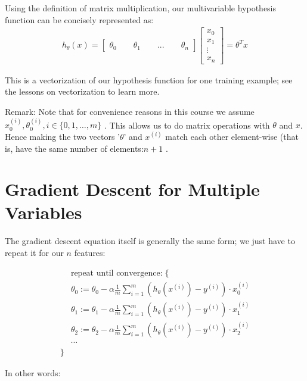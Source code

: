 \documentclass[10pt,a4paper,UTF8]{article}
\begin{document}
Using the definition of matrix multiplication, our multivariable hypothesis function can be concisely represented as:
\begin{align*}h_\theta(x) =\begin{bmatrix}\theta_0 \hspace{2em} \theta_1 \hspace{2em} ... \hspace{2em} \theta_n\end{bmatrix}\begin{bmatrix}x_0 \\ x_1 \\ \vdots \\ x_n\end{bmatrix}= \theta^T x\end{align*}

This is a vectorization of our hypothesis function for one training example; see the lessons on vectorization to learn more.

Remark: Note that for convenience reasons in this course we assume \(x_{0}^{(i)},\theta_{0}^{(i)},i\in \{0,1,\ldots ,m\}\) . This allows us to do matrix operations with \(\theta\) and \(x\). Hence making the two vectors '\(\theta\)' and \(x^{(i)}\) match each other element-wise (that is, have the same number of elements:\(n+1\) .

\section{Gradient Descent for Multiple Variables}
\label{sec:org2e1ebfb}

The gradient descent equation itself is generally the same form; we just have to repeat it for our \(n\) features:

\begin{align*} & \text{repeat until convergence:} \; \lbrace \\ \; & \theta_0 := \theta_0 - \alpha \frac{1}{m} \sum\limits_{i=1}^{m} (h_\theta(x^{(i)}) - y^{(i)}) \cdot x_0^{(i)}\\ \; & \theta_1 := \theta_1 - \alpha \frac{1}{m} \sum\limits_{i=1}^{m} (h_\theta(x^{(i)}) - y^{(i)}) \cdot x_1^{(i)} \\ \; & \theta_2 := \theta_2 - \alpha \frac{1}{m} \sum\limits_{i=1}^{m} (h_\theta(x^{(i)}) - y^{(i)}) \cdot x_2^{(i)} \\ & \cdots \\ \rbrace \end{align*}

In other words:
\end{document}
